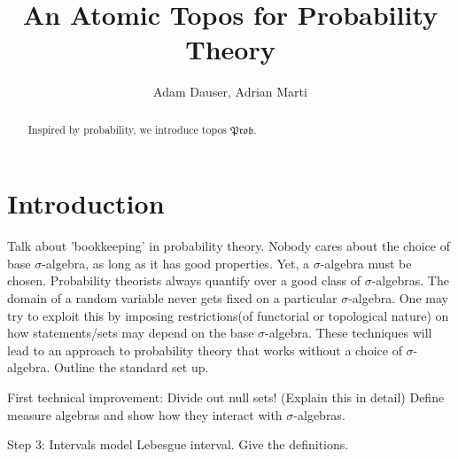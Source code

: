 \documentclass[a4paper]{amsproc}
\title{An Atomic Topos for Probability Theory}
\author{Adam Dauser, Adrian Marti}
\date{}
\theoremstyle{plain}
\theoremstyle{definition}
\theoremstyle{remark}
\numberwithin{equation}{section}
\newcommand{\Prob}{\mathfrak{Prob}}
\begin{document}
\maketitle

\begin{abstract}
Inspired by probability, we introduce topos $\Prob$. %
\end{abstract}

\tableofcontents


\section{Introduction}

Talk about 'bookkeeping' in probability theory. Nobody cares about the choice of base $\sigma$-algebra, as long as it has good properties. Yet, a $\sigma$-algebra must be chosen. Probability theorists always quantify over a good class of $\sigma$-algebras. The domain of a random variable never gets fixed on a particular $\sigma$-algebra. One may try to exploit this by imposing restrictions(of functorial or topological nature) on how statements/sets may depend on the base $\sigma$-algebra. These techniques will lead to an approach to probability theory that works without a choice of $\sigma$-algebra. Outline the standard set up.

First technical improvement: Divide out null sets! (Explain this in detail) Define measure algebras and show how they interact with $\sigma$-algebras.

Step 3:  Intervals model Lebesgue interval. Give the definitions.
\end{document}
